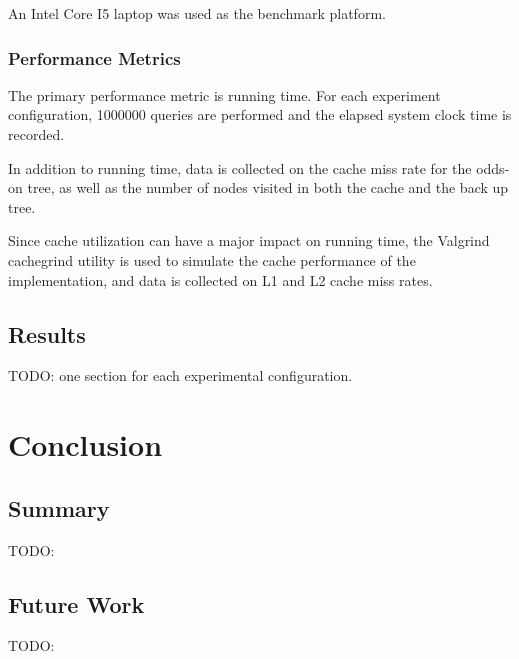 \documentclass[mcs]{scsthesis}
\begin{document}
An Intel Core I5 laptop was used as the benchmark platform.

\subsection{Performance Metrics}

The primary performance metric is running time.  For each experiment
configuration, 1000000 queries are performed and the elapsed system clock
time is recorded.

In addition to running time, data is collected on the cache miss rate for the
odds-on tree, as well as the number of nodes visited in both the cache and the
back up tree.

Since cache utilization can have a major impact on running time, the Valgrind
\cite{valgrind} cachegrind utility is used to simulate the cache performance
of the implementation, and data is collected on L1 and L2 cache miss rates.

\section{Results}

TODO: one section for each experimental configuration.

\chapter{Conclusion}

\section{Summary}

TODO:

\section{Future Work}

TODO:
\end{document}
